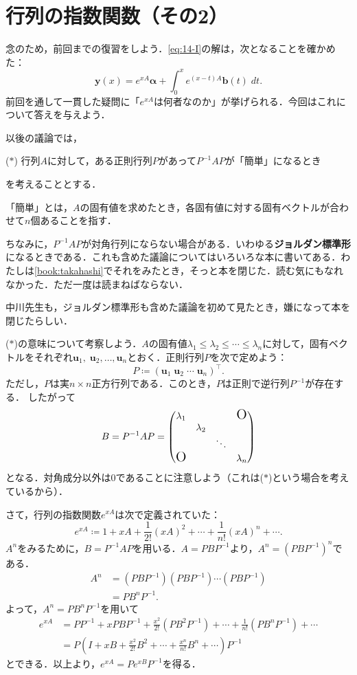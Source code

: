 \section{行列の指数関数（その2）}
念のため，前回までの復習をしよう．\eqref{eq:14-I}の解は，次となることを確かめた：
    \[ \bm{y}(x) = e^{xA}\bm{\alpha} + \int_{0}^{x} e^{(x-t)A}\bm{b}(t) \; dt.\]
前回を通して一貫した疑問に「$e^{xA}$は何者なのか」が挙げられる．今回はこれについて答えを与えよう．

以後の議論では，
\begin{center}
    ($\ast$) 行列$A$に対して，ある正則行列$P$があって$P^{-1}AP$が「簡単」になるとき
\end{center}
を考えることとする．

\begin{note*}[「簡単」とは]
    「簡単」とは，$A$の固有値を求めたとき，各固有値に対する固有ベクトルが合わせて$n$個あることを指す．

    ちなみに，$P^{-1}AP$が対角行列にならない場合がある．いわゆる\textbf{ジョルダン標準形}になるときである．これも含めた議論についてはいろいろな本に書いてある．わたしは\ref{book:takahashi}でそれをみたとき，そっと本を閉じた．読む気にもなれなかった．ただ一度は読まねばならない．
\end{note*}
\begin{talk*}
    中川先生も，ジョルダン標準形も含めた議論を初めて見たとき，嫌になって本を閉じたらしい．
\end{talk*}

($\ast$)の意味について考察しよう．$A$の固有値$\lambda_1 \leq \lambda_2 \leq \cdots \leq \lambda_n$に対して，固有ベクトルをそれぞれ$\bm{u}_1,\; \bm{u}_2, \ldots, \bm{u}_n$とおく．正則行列$P$を次で定めよう：
\[ P \coloneqq (\bm{u}_1 \; \bm{u}_2 \; \cdots \; \bm{u}_n)^\top. \]
ただし，$P$は実$n \times n$正方行列である．このとき，$P$は正則で逆行列$P^{-1}$が存在する．
したがって
\[ B = P^{-1}AP = 
\begin{pmatrix}
    \lambda_1 & & & \text{\Large O} \\
     & \lambda_2 & & \\
     & & \ddots & \\
     \text{\Large O}& & & \lambda_n
\end{pmatrix}\]
となる．対角成分以外は0であることに注意しよう（これは($\ast$)という場合を考えているから）．

さて，行列の指数関数$e^{xA}$は次で定義されていた：
\[ e^{xA} \coloneqq 1 + xA + \frac{1}{2!}(xA)^2 + \cdots + \frac{1}{n!}(xA)^n + \cdots. \]
$A^n$をみるために，$B=P^{-1}AP$を用いる．$A=PBP^{-1}$より，$A^n=(PBP^{-1})^n$である．
\begin{align*}
    A^n &= (PBP^{-1})(PBP^{-1}) \cdots (PBP^{-1}) \\
    &= PB^nP^{-1}.
\end{align*}
よって，$A^n=PB^nP^{-1}$を用いて
\begin{align*}
    e^{xA} &= PP^{-1} + xPBP^{-1} + \frac{x^2}{2!}(PB^2P^{-1}) + \cdots + \frac{1}{n!}(PB^nP^{-1}) + \cdots \\
    &= P(I + xB + \frac{x^2}{2!}B^2 + \cdots + \frac{x^n}{n!}B^n + \cdots)P^{-1}
\end{align*}
とできる．以上より，$e^{xA}=Pe^{xB}P^{-1}$を得る．


